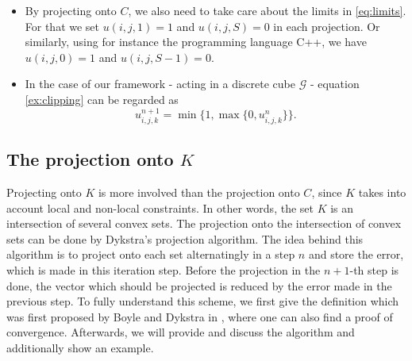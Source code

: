     \begin{remark}
        \begin{itemize}
            \item By projecting onto $C$, we also need to take care about the limits in \ref{eq:limits}. For that we set $u(i, j, 1) = 1$ and $u(i, j, S) = 0$ in each projection. Or similarly, using for instance the programming language C++, we have $u(i, j, 0) = 1$ and $u(i, j, S-1) = 0$.
            \item In the case of our framework - acting in a discrete cube $\mathcal{G}$ - equation \ref{ex:clipping} can be regarded as
                $$
                    u^{n+1}_{i,j,k} = \min\{1, \max \{ 0, u^{n}_{i,j,k} \} \}.
                $$
        \end{itemize}
    \end{remark}

    \subsection{The projection onto $K$} %
    \label{sub:the_projection_onto_K}

        Projecting onto $K$ is more involved than the projection onto $C$, since $K$ takes into account local and non-local constraints. In other words, the set $K$ is an intersection of several convex sets. The projection onto the intersection of convex sets can be done by Dykstra's projection algorithm. The idea behind this algorithm is to project onto each set alternatingly in a step $n$ and store the error, which is made in this iteration step. Before the projection in the $n+1$-th step is done, the vector which should be projected is reduced by the error made in the previous step. To fully understand this scheme, we first give the definition which was first proposed by Boyle and Dykstra in \cite{dykstra-et-al-aors14}, where one can also find a proof of convergence. Afterwards, we will provide and discuss the algorithm and additionally show an example.

